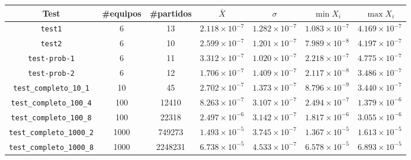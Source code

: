 \documentclass[a4paper]{article}
\begin{document}
\begin{center}
    \begin{tabular}{ c | c c | c c c c } 
    Test & \#equipos & \#partidos & $\bar{X}$ & $\sigma$ & $\min X_i $ & $\max X_i$
    \\ \hline
    \texttt{test1}
        & 6
        & 13
        & $2.118 \times 10^{-7}$
        & $1.282 \times 10^{-7}$
        & $1.083 \times 10^{-7}$
        & $4.169 \times 10^{-7}$
    \\ \hline
    \texttt{test2}
        & 6
        & 10
        & $2.599 \times 10^{-7}$
        & $1.201 \times 10^{-7}$
        & $7.989 \times 10^{-8}$
        & $4.197 \times 10^{-7}$
    \\ \hline
    \texttt{test-prob-1}
        & 6
        & 11
        & $3.312 \times 10^{-7}$
        & $1.020 \times 10^{-7}$
        & $2.218 \times 10^{-7}$
        & $4.775 \times 10^{-7}$
    \\ \hline
    \texttt{test-prob-2}
        & 6
        & 12
        & $1.706 \times 10^{-7}$
        & $1.409 \times 10^{-7}$
        & $2.117 \times 10^{-8}$
        & $3.486 \times 10^{-7}$
    \\ \hline
    \texttt{test\_completo\_10\_1}
        & 10
        & 45
        & $2.702 \times 10^{-7}$
        & $1.373 \times 10^{-7}$
        & $8.796 \times 10^{-9}$
        & $3.440 \times 10^{-7}$
    \\ \hline
    \texttt{test\_completo\_100\_4}
        & 100
        & 12410
        & $8.263 \times 10^{-7}$
        & $3.107 \times 10^{-7}$
        & $2.494 \times 10^{-7}$
        & $1.379 \times 10^{-6}$
    \\ \hline
    \texttt{test\_completo\_100\_8}
        & 100
        & 22318
        & $2.497 \times 10^{-6}$
        & $3.142 \times 10^{-7}$
        & $1.817 \times 10^{-6}$
        & $3.055 \times 10^{-6}$
    \\ \hline
    \texttt{test\_completo\_1000\_2}
        & 1000
        & 749273
        & $1.493 \times 10^{-5}$
        & $3.745 \times 10^{-7}$
        & $1.367 \times 10^{-5}$
        & $1.613 \times 10^{-5}$
    \\ \hline
    \texttt{test\_completo\_1000\_8}
        & 1000
        & 2248231
        & $6.738 \times 10^{-5}$
        & $4.533 \times 10^{-7}$
        & $6.578 \times 10^{-5}$
        & $6.893 \times 10^{-5}$
    \\
\end{tabular}
\label{tbl:errores}
\end{center}
\end{document}
